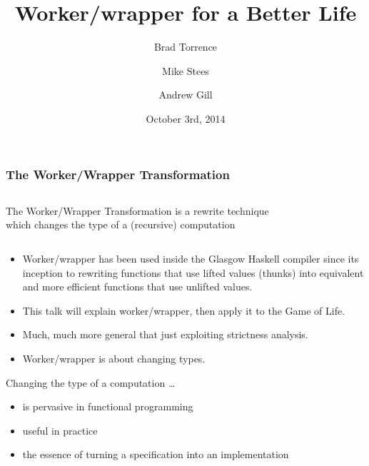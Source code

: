 \documentclass[smaller]{beamer}
\title{Worker/wrapper for a Better Life}
\author{Brad Torrence\and Mike Stees\and Andrew Gill}
\institute{Information and Telecommunication Technology Center\\The University of Kansas}
\date{October 3rd, 2014}
\begin{document}
\frame{\titlepage}

\begin{frame}
\frametitle{The Worker/Wrapper Transformation}


\begin{columns}[t]
\begin{column}{0.8\textwidth}
\begin{block}{}
\begin{center}
The Worker/Wrapper Transformation is a rewrite technique\\
which changes the type of a (recursive) computation
\end{center}
\end{block}
\end{column}
\end{columns}


\vskip 0.1in

\begin{itemize}
\item Worker/wrapper has been used inside the Glasgow Haskell compiler since its inception to
rewriting functions that use lifted values (thunks) into equivalent and more efficient functions that use unlifted values.
\item This talk will explain worker/wrapper, then apply it to the Game of Life.
\item Much, much more general that just exploiting strictness analysis.
\item Worker/wrapper is about changing types.
\end{itemize}

\frameskip

\begin{block}{Changing the type of a computation \ldots}
\begin{itemize}
\item is pervasive in functional programming
\item useful in practice
\item the essence of turning a specification into an implementation
\end{itemize}
\end{block}

\end{frame}
\end{document}

